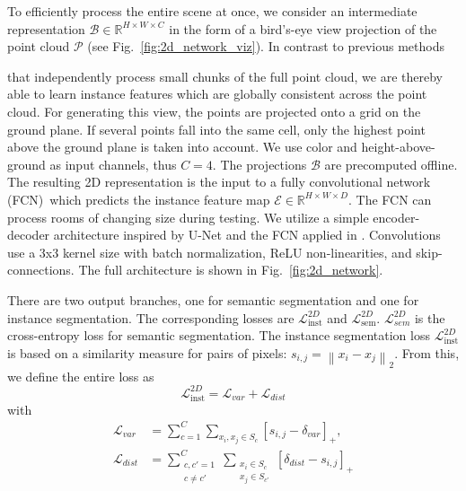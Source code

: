 \documentclass[runningheads]{llncs}
\newcommand{\reffig}[1]{Fig.~\ref{fig:#1}}
\newcommand\norm[1]{\left\lVert#1\right\rVert}
\begin{document}
To efficiently process the entire scene at once, we consider an intermediate representation $\mathcal{B}\in\mathbb{R}^{H \times W \times C}$ in the form of a bird's-eye view projection of the point cloud $\mathcal{P}$ (see \reffig{2d_network_viz}).
In contrast to previous methods {\cite{Wang18CVPR} that independently process small chunks of the full point cloud, we are thereby able to learn instance features which are globally consistent across the point cloud. For generating this view, the points are projected onto a grid on the ground plane. If several points fall into the same cell, only the highest point above the ground plane is taken into account. 
We use color and height-above-ground as input channels, thus $C=4$.
The projections $\mathcal{B}$ are precomputed offline.
The resulting 2D representation is the input to a fully convolutional network (FCN)\,\cite{Shelhamer17PAMI} which predicts the instance feature map $\mathcal{E} \in \mathbb{R}^{H \times W \times D}$.
The FCN can process rooms of changing size during testing.
We utilize a simple encoder-decoder architecture inspired by U-Net \cite{Ronneberger15MICCAI} and the FCN applied in \cite{Hsu18IJCNN}.
Convolutions use a 3x3 kernel size with batch normalization, ReLU non-linearities, and skip-connections.
The full architecture is shown in \reffig{2d_network}.

There are two output branches, one for semantic segmentation and one for instance segmentation.
The corresponding losses are $\mathcal{L}^{2D}_{\text{inst}}$ and $\mathcal{L}^{2D}_{\text{sem}}$.
$\mathcal{L}^{2D}_{sem}$ is the cross-entropy loss for semantic segmentation.
The instance segmentation loss $\mathcal{L}^{2D}_{\text{inst}}$ is based on
a similarity measure for pairs of pixels:
$s_{i,j}=\norm{x_i-x_j}_2$.
From this, we define the entire loss as 
\begin{equation}
	\mathcal{L}^{2D}_{\text{inst}} = \mathcal{L}_{var} + \mathcal{L}_{dist}
\end{equation}
with
\begin{equation}
\begin{split}
	\mathcal{L}_{var} &= \sum^C_{c=1} \sum_{x_i, x_j\in S_c} [s_{i,j}-\delta_{var}]_+, \\
	\mathcal{L}_{dist} &= \sum^C_{\substack{c, c'=1\\ c\neq c'}} \sum_{\substack{x_i\in S_c\\ x_j \in S_{c'}}} [\delta_{dist}-s_{i,j}]_+
\end{split}
\end{equation}

}
\end{document}
